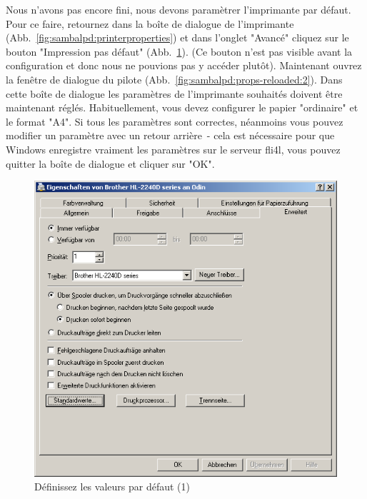 Nous n'avons pas encore fini, nous devons paramètrer l'imprimante par défaut.
Pour ce faire, retournez dans la boîte de dialogue de l'imprimante
(Abb.~\ref{fig:sambalpd:printerproperties}) et dans l'onglet "Avancé" cliquez sur
le bouton "Impression pas défaut" (Abb.~\ref{fig:sambalpd:props-reloaded:1}). (Ce bouton
n'est pas visible avant la configuration et donc nous ne pouvions pas y accéder plutôt).
Maintenant ouvrez la fenêtre de dialogue du pilote (Abb.~\ref{fig:sambalpd:props-reloaded:2}).
Dans cette boîte de dialogue les paramètres de l'imprimante souhaités doivent être
maintenant réglés. Habituellement, vous devez configurer le papier "ordinaire" et
le format "A4". Si tous les paramètres sont correctes, néanmoins vous pouvez modifier
un paramètre avec un retour arrière~- cela est nécessaire pour que Windows enregistre
vraiment les paramètres sur le serveur fli4l, vous pouvez quitter la boîte de dialogue
et cliquer sur "OK".

\begin{figure}[hbt!]
\centering
\includegraphics[width=0.8\columnwidth]{image018}
\caption{Définissez les valeurs par défaut (1)}
\label{fig:sambalpd:props-reloaded:1}
\end{figure}


